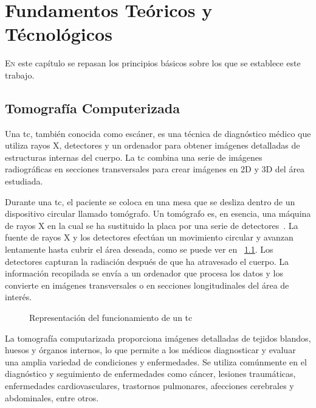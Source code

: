 \chapter{Fundamentos Teóricos y Técnológicos}
\label{chap:ft}
\lettrine{E}{n} este capítulo se repasan los principios básicos sobre los que se establece este trabajo.
\section{Tomografía Computerizada}

Una \acrfull{tc}, también conocida como escáner, es una técnica de
diagnóstico médico que utiliza rayos X, detectores y un ordenador para
obtener imágenes detalladas de estructuras internas del cuerpo. La
\acrshort{tc} combina una serie de imágenes radiográficas en secciones
transversales para crear imágenes en 2D y 3D del área estudiada.

Durante una \acrshort{tc}, el paciente se coloca en una mesa que se
desliza dentro de un dispositivo circular llamado tomógrafo. Un
tomógrafo es, en esencia, una máquina de rayos X en la cual se ha
sustituido la placa por una serie de
detectores~\cite{muniz2006introduccion}. La fuente de rayos X y los
detectores efectúan un movimiento circular y avanzan lentamente hasta
cubrir el área deseada, como se puede ver en
\figurename~\ref{fig:tac}. Los detectores capturan la radiación
después de que ha atravesado el cuerpo. La información recopilada se
envía a un ordenador que procesa los datos y los convierte en imágenes
transversales o en secciones longitudinales del área de interés.

\begin{figure}%
	\centering
	\qquad
	\caption{Representación del funcionamiento de un \acrshort{tc}}%
	\label{fig:tac}%
\end{figure}

La tomografía computarizada proporciona imágenes detalladas de tejidos
blandos, huesos y órganos internos, lo que permite a los médicos
diagnosticar y evaluar una amplia variedad de condiciones y
enfermedades. Se utiliza comúnmente en el diagnóstico y seguimiento de
enfermedades como cáncer, lesiones traumáticas, enfermedades
cardiovasculares, trastornos pulmonares, afecciones cerebrales y
abdominales, entre otros.



